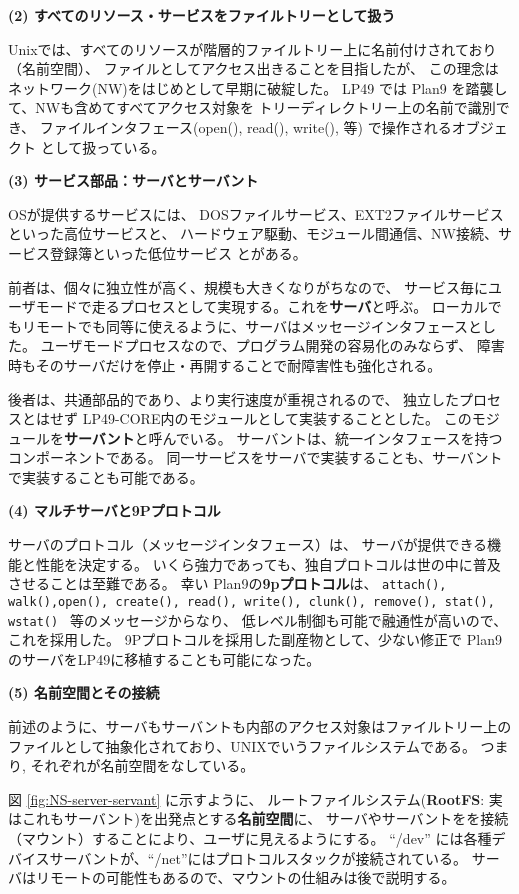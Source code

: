 {\bf\flushleft (2) すべてのリソース・サービスをファイルトリーとして扱う}

   Unixでは、すべてのリソースが階層的ファイルトリー上に名前付けされており（名前空間）、
  ファイルとしてアクセス出きることを目指したが、
  この理念はネットワーク(NW)をはじめとして早期に破綻した。
  LP49 では Plan9 を踏襲して、NWも含めてすべてアクセス対象を
  トリーディレクトリー上の名前で識別でき、
  ファイルインタフェース(open(), read(), write(), 等) で操作されるオブジェクト
  として扱っている。

{\bf\flushleft (3) サービス部品：サーバとサーバント}

  OSが提供するサービスには、
  DOSファイルサービス、EXT2ファイルサービスといった高位サービスと、
  ハードウェア駆動、モジュール間通信、NW接続、サービス登録簿といった低位サービス
  とがある。

  前者は、個々に独立性が高く、規模も大きくなりがちなので、
  サービス毎にユーザモードで走るプロセスとして実現する。これを{\bf サーバ}と呼ぶ。
  ローカルでもリモートでも同等に使えるように、サーバはメッセージインタフェースとした。
  ユーザモードプロセスなので、プログラム開発の容易化のみならず、
  障害時もそのサーバだけを停止・再開することで耐障害性も強化される。

  後者は、共通部品的であり、より実行速度が重視されるので、
  独立したプロセスとはせず LP49-CORE内のモジュールとして実装することとした。
  このモジュールを{\bf サーバント}と呼んでいる。
  サーバントは、統一インタフェースを持つコンポーネントである。
  同一サービスをサーバで実装することも、サーバントで実装することも可能である。

{\bf\flushleft (4) マルチサーバと9Pプロトコル}

  サーバのプロトコル（メッセージインタフェース）は、
  サーバが提供できる機能と性能を決定する。
  いくら強力であっても、独自プロトコルは世の中に普及させることは至難である。
  幸い Plan9の{\bf 9pプロトコル}は、
  {\tt attach(), walk(),open(), create(), 
  read(), write(), clunk(), remove(), stat(), wstat() }
  等のメッセージからなり、
  低レベル制御も可能で融通性が高いので、これを採用した。
  9Pプロトコルを採用した副産物として、少ない修正で
  Plan9のサーバをLP49に移植することも可能になった。

{\bf\flushleft (5) 名前空間とその接続}

  前述のように、サーバもサーバントも内部のアクセス対象はファイルトリー上の
ファイルとして抽象化されており、UNIXでいうファイルシステムである。
つまり, それぞれが名前空間をなしている。

図 \ref{fig:NS-server-servant} に示すように、
ルートファイルシステム({\bf RootFS}: 実はこれもサーバント)を出発点とする{\bf 名前空間}に、
サーバやサーバントをを接続（マウント）することにより、ユーザに見えるようにする。
``/dev'' には各種デバイスサーバントが、``/net''にはプロトコルスタックが接続されている。
サーバはリモートの可能性もあるので、マウントの仕組みは後で説明する。

